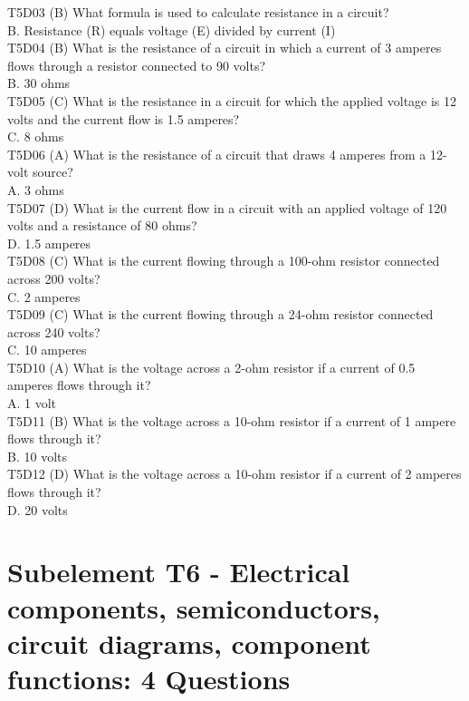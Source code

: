 \documentclass[12pt,letterpaper]{report}
\begin{document}
T5D03 (B) What formula is used to calculate resistance in a circuit?\\
B. Resistance (R) equals voltage (E) divided by current (I)\\

T5D04 (B) What is the resistance of a circuit in which a current of 3 amperes flows through a resistor connected to 90 volts?\\
B. 30 ohms\\

T5D05 (C) What is the resistance in a circuit for which the applied voltage is 12 volts and the current flow is 1.5 amperes?\\
C. 8 ohms\\

T5D06 (A) What is the resistance of a circuit that draws 4 amperes from a 12-volt source?\\
A. 3 ohms\\

T5D07 (D) What is the current flow in a circuit with an applied voltage of 120 volts and a resistance of 80 ohms?\\
D. 1.5 amperes\\

T5D08 (C) What is the current flowing through a 100-ohm resistor connected across 200 volts?\\
C. 2 amperes\\

T5D09 (C) What is the current flowing through a 24-ohm resistor connected across 240 volts?\\
C. 10 amperes\\

T5D10 (A) What is the voltage across a 2-ohm resistor if a current of 0.5 amperes flows through it?\\
A. 1 volt\\

T5D11 (B) What is the voltage across a 10-ohm resistor if a current of 1 ampere flows through it?\\
B. 10 volts\\

T5D12 (D) What is the voltage across a 10-ohm resistor if a current of 2 amperes flows through it?\\
D. 20 volts\\

\chapter{Subelement T6 - Electrical components, semiconductors, circuit diagrams, component functions: 4 Questions}
\end{document}
